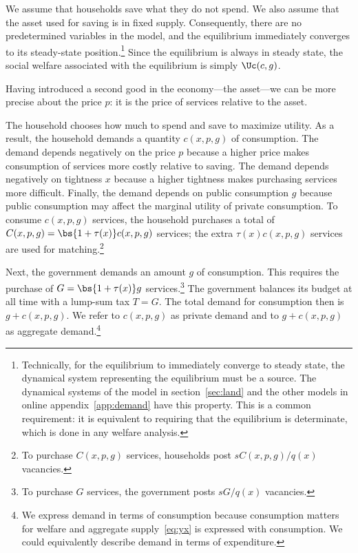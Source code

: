 \documentclass[letterpaper,12pt,leqno]{article}
\begin{document}
\begin{bibunit}
We assume that households save what they do not spend. We also assume that the asset used for saving is in fixed supply. Consequently, there are no predetermined variables in the model, and the equilibrium immediately converges to its steady-state position.\footnote{Technically, for the equilibrium to immediately converge to steady state, the dynamical system representing the equilibrium must be a source. The dynamical systems of the model in section~\ref{sec:land} and the other models in online appendix~\ref{app:demand} have this property. This is a common requirement: it is equivalent to requiring that the equilibrium is determinate, which is done in any welfare analysis.} Since the equilibrium is always in steady state, the social welfare associated with the equilibrium is simply $\Uc(c,g)$.

Having introduced a second good in the economy---the asset---we can be more precise about the price $p$: it is the price of services relative to the asset.

The household chooses how much to spend and save to maximize utility. As a result, the household demands a quantity $c(x,p,g)$ of consumption.  The demand depends negatively on the price $p$ because a higher price makes consumption of services more costly relative to saving. The demand depends negatively on tightness $x$ because a higher tightness makes purchasing services more difficult. Finally, the demand depends on public consumption $g$ because public consumption may affect the marginal utility of private consumption. To consume $c(x,p,g)$ services, the household purchases a total of $C(x,p,g)=\bs{1+\tau(x)} c(x,p,g)$ services; the extra $\tau(x) c(x,p,g)$ services are used for matching.\footnote{To purchase $C(x,p,g)$ services, households post $s C(x,p,g)/q(x)$ vacancies.}

Next, the government demands an amount $g$ of consumption. This requires the purchase of $G= \bs{1+\tau(x)} g$ services.\footnote{To purchase $G$ services, the government posts $s G/q(x)$ vacancies.} The government balances its budget at all time with a lump-sum tax $T=G$. The total demand for consumption then is $g+c(x,p,g)$. We refer to $c(x,p,g)$ as private demand and to $g+c(x,p,g)$ as aggregate demand.\footnote{We express demand in terms of consumption because consumption matters for welfare and aggregate supply~\eqref{eq:yx} is expressed with consumption. We could equivalently describe demand in terms of expenditure.}


\end{bibunit}
\end{document}
